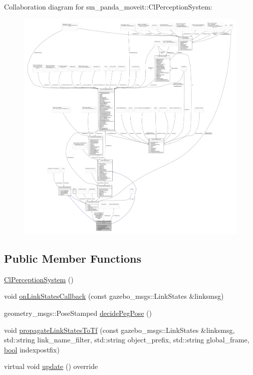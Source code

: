 Collaboration diagram for sm\+\_\+panda\+\_\+moveit\+:\+:Cl\+Perception\+System\+:
\nopagebreak
\begin{figure}[H]
\begin{center}
\leavevmode
\includegraphics[width=350pt]{classsm__panda__moveit_1_1ClPerceptionSystem__coll__graph}
\end{center}
\end{figure}
\subsection*{Public Member Functions}
\begin{DoxyCompactItemize}
\item 
\hyperlink{classsm__panda__moveit_1_1ClPerceptionSystem_acbab40cf31fbcd8733a9a40821cb7b13}{Cl\+Perception\+System} ()
\item 
void \hyperlink{classsm__panda__moveit_1_1ClPerceptionSystem_a017fd058419a7279487da03d180bb2d2}{on\+Link\+States\+Callback} (const gazebo\+\_\+msgs\+::\+Link\+States \&linksmsg)
\item 
geometry\+\_\+msgs\+::\+Pose\+Stamped \hyperlink{classsm__panda__moveit_1_1ClPerceptionSystem_af90368e6bddd4bda759f6b859c0b37e6}{decide\+Peg\+Pose} ()
\item 
void \hyperlink{classsm__panda__moveit_1_1ClPerceptionSystem_a0c02770eff276808972e341c939a9e97}{propagate\+Link\+States\+To\+Tf} (const gazebo\+\_\+msgs\+::\+Link\+States \&linksmsg, std\+::string link\+\_\+name\+\_\+filter, std\+::string object\+\_\+prefix, std\+::string global\+\_\+frame, \hyperlink{classbool}{bool} indexpostfix)
\item 
virtual void \hyperlink{classsm__panda__moveit_1_1ClPerceptionSystem_aa3a4c77ca5c046b2f07d775bf3838f4f}{update} () override
\end{DoxyCompactItemize}

